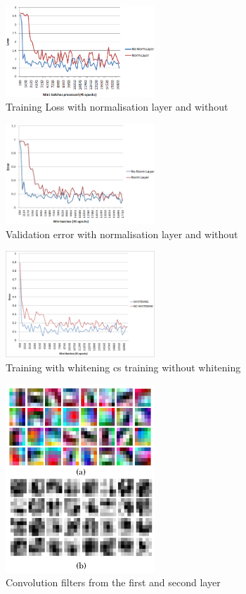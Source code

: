 \documentclass[conference]{IEEEtran}
\begin{document}
\begin{figure}[ht]
    \centering
    \includegraphics[width=0.5\textwidth]{Figure3a.png}
    \caption{Training Loss with normalisation layer and without}
    \label{fig:normloss1}
\end{figure}
\begin{figure}[ht]
    \centering
    \includegraphics[width=0.5\textwidth]{Figure3b.png}
    \caption{Validation error with normalisation layer and without}
    \label{fig:normloss2}
\end{figure}
\begin{figure}[ht]
    \centering
    \includegraphics[width=0.5\textwidth]{Figure4.png}
    \caption{Training with whitening cs training without whitening}
    \label{fig:whitening}
\end{figure}
\begin{figure}[ht]
    \centering
    \includegraphics[width=0.5\textwidth]{conv_filters.png}
    \caption{Convolution filters from the first and second layer}
    \label{fig:filters}
\end{figure}
\end{document}
